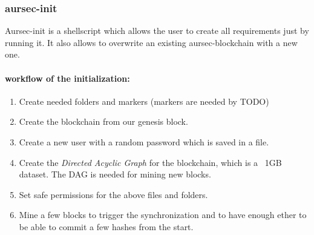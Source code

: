 \subsubsection{aursec-init}
Aursec-init is a shellscript which allows the user to create all requirements just by running it. It also allows to overwrite an existing aursec-blockchain with a new one.

\paragraph*{workflow of the initialization:}
\begin{enumerate}
	\item Create needed folders and markers (markers are needed by TODO)
	\item Create the blockchain from our genesis block.
	\item Create a new user with a random password which is saved in a file.
	\item Create the \emph{Directed Acyclic Graph} for the blockchain, which is a ~1GB dataset. The DAG is needed for mining new blocks. \cite{wiki:DAG}
	\item Set safe permissions for the above files and folders.
	\item Mine a few blocks to trigger the synchronization and to have enough ether to be able to commit a few hashes from the start. %
\end{enumerate}